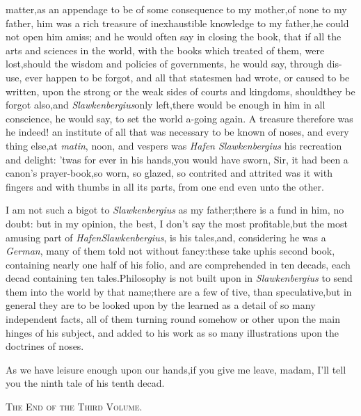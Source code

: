 \documentclass{article}
\begin{document}
 matter,\tsh as an appendage to\break
{}\break
be of some consequence to my
mother,\tsk of none to my father, \break
him was a rich treasure of inexhaustible\break
knowledge to my father,\tsk he could not 
open \enlargethispage\baselineskip
him amiss; and he would often say in closing the book,
that if all the arts and sciences in the world, with the
books which treated of them, were lost,\tsk\break should the
wisdom and policies of governments, he would say, through
dis-\break use, ever happen to be forgot, and all that statesmen had
wrote, or caused to be written, upon the strong or the weak
sides of courts and kingdoms, should\break they be forgot
also,\tsk and \textit{Slawkenbergius}\break only left,\tsk there
would be enough in him in all conscience, he would say, to
set the world a-going again. A treasure therefore was he
indeed! an institute of all that was necessary to be known
of noses, and every thing else,\tsk at \textit{matin}, noon,
and vespers was \textit{Hafen Slawkenbergius} his recreation
and delight: ’twas for ever in his hands,\tsh you would have
sworn, Sir, it had been a canon’s prayer-book,\tsk so worn,
so glazed, so contrited and attrited was it with fingers
and with thumbs in all its parts, from one end even unto the
other.

I am not such a bigot to \textit{Slawkenber\-gius} as my
father;\tsk there is a fund in him, no doubt: but in my
opinion, the best, I don’t say the most profitable,\break but
the most amusing part of \textit{Hafen}\break\textit{Slawkenbergius}, is
his tales,\tsh and, considering he was a \textit{German},
many of them told not without fancy:\tsh these take up\break his
second book, containing nearly one half of his folio, and are
comprehended in ten decads, each decad containing ten
tales.\tsh Philosophy is not built upon
in \textit{Slawkenbergius} to send them into the 
world by that name;\tsk there are a few of 
tive, than speculative,\tsk but in general
they are to be looked upon by the learned as a detail of so many
independent facts, all of them turning round somehow or other upon
the main hinges of his subject, and added to his work as so many
illustrations upon the doctrines of noses.

As we have leisure enough upon our hands,\tsh if you
give me leave, madam, I’ll tell you the ninth tale of his
tenth decad.

\bigskip
\centerline{\textsc{The End of the Third Volume}.}
\end{document}
